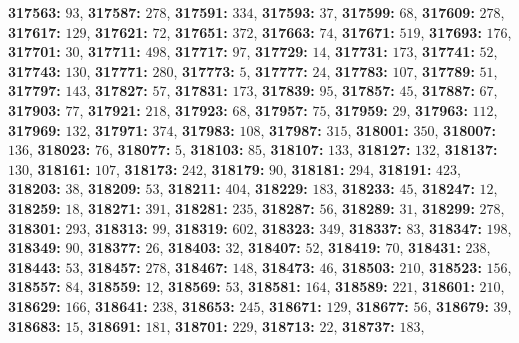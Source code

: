 \textsf{\bfseries 317563:} $93$, \textsf{\bfseries 317587:} $278$, \textsf{\bfseries 317591:} $334$, \textsf{\bfseries 317593:} $37$, \textsf{\bfseries 317599:} $68$, \textsf{\bfseries 317609:} $278$, \textsf{\bfseries 317617:} $129$, \textsf{\bfseries 317621:} $72$, \textsf{\bfseries 317651:} $372$, \textsf{\bfseries 317663:} $74$, \textsf{\bfseries 317671:} $519$, \textsf{\bfseries 317693:} $176$, \textsf{\bfseries 317701:} $30$, \textsf{\bfseries 317711:} $498$, \textsf{\bfseries 317717:} $97$, \textsf{\bfseries 317729:} $14$, \textsf{\bfseries 317731:} $173$, \textsf{\bfseries 317741:} $52$, \textsf{\bfseries 317743:} $130$, \textsf{\bfseries 317771:} $280$, \textsf{\bfseries 317773:} $5$, \textsf{\bfseries 317777:} $24$, \textsf{\bfseries 317783:} $107$, \textsf{\bfseries 317789:} $51$, \textsf{\bfseries 317797:} $143$, \textsf{\bfseries 317827:} $57$, \textsf{\bfseries 317831:} $173$, \textsf{\bfseries 317839:} $95$, \textsf{\bfseries 317857:} $45$, \textsf{\bfseries 317887:} $67$, \textsf{\bfseries 317903:} $77$, \textsf{\bfseries 317921:} $218$, \textsf{\bfseries 317923:} $68$, \textsf{\bfseries 317957:} $75$, \textsf{\bfseries 317959:} $29$, \textsf{\bfseries 317963:} $112$, \textsf{\bfseries 317969:} $132$, \textsf{\bfseries 317971:} $374$, \textsf{\bfseries 317983:} $108$, \textsf{\bfseries 317987:} $315$, \textsf{\bfseries 318001:} $350$, \textsf{\bfseries 318007:} $136$, \textsf{\bfseries 318023:} $76$, \textsf{\bfseries 318077:} $5$, \textsf{\bfseries 318103:} $85$, \textsf{\bfseries 318107:} $133$, \textsf{\bfseries 318127:} $132$, \textsf{\bfseries 318137:} $130$, \textsf{\bfseries 318161:} $107$, \textsf{\bfseries 318173:} $242$, \textsf{\bfseries 318179:} $90$, \textsf{\bfseries 318181:} $294$, \textsf{\bfseries 318191:} $423$, \textsf{\bfseries 318203:} $38$, \textsf{\bfseries 318209:} $53$, \textsf{\bfseries 318211:} $404$, \textsf{\bfseries 318229:} $183$, \textsf{\bfseries 318233:} $45$, \textsf{\bfseries 318247:} $12$, \textsf{\bfseries 318259:} $18$, \textsf{\bfseries 318271:} $391$, \textsf{\bfseries 318281:} $235$, \textsf{\bfseries 318287:} $56$, \textsf{\bfseries 318289:} $31$, \textsf{\bfseries 318299:} $278$, \textsf{\bfseries 318301:} $293$, \textsf{\bfseries 318313:} $99$, \textsf{\bfseries 318319:} $602$, \textsf{\bfseries 318323:} $349$, \textsf{\bfseries 318337:} $83$, \textsf{\bfseries 318347:} $198$, \textsf{\bfseries 318349:} $90$, \textsf{\bfseries 318377:} $26$, \textsf{\bfseries 318403:} $32$, \textsf{\bfseries 318407:} $52$, \textsf{\bfseries 318419:} $70$, \textsf{\bfseries 318431:} $238$, \textsf{\bfseries 318443:} $53$, \textsf{\bfseries 318457:} $278$, \textsf{\bfseries 318467:} $148$, \textsf{\bfseries 318473:} $46$, \textsf{\bfseries 318503:} $210$, \textsf{\bfseries 318523:} $156$, \textsf{\bfseries 318557:} $84$, \textsf{\bfseries 318559:} $12$, \textsf{\bfseries 318569:} $53$, \textsf{\bfseries 318581:} $164$, \textsf{\bfseries 318589:} $221$, \textsf{\bfseries 318601:} $210$, \textsf{\bfseries 318629:} $166$, \textsf{\bfseries 318641:} $238$, \textsf{\bfseries 318653:} $245$, \textsf{\bfseries 318671:} $129$, \textsf{\bfseries 318677:} $56$, \textsf{\bfseries 318679:} $39$, \textsf{\bfseries 318683:} $15$, \textsf{\bfseries 318691:} $181$, \textsf{\bfseries 318701:} $229$, \textsf{\bfseries 318713:} $22$, \textsf{\bfseries 318737:} $183$, 
